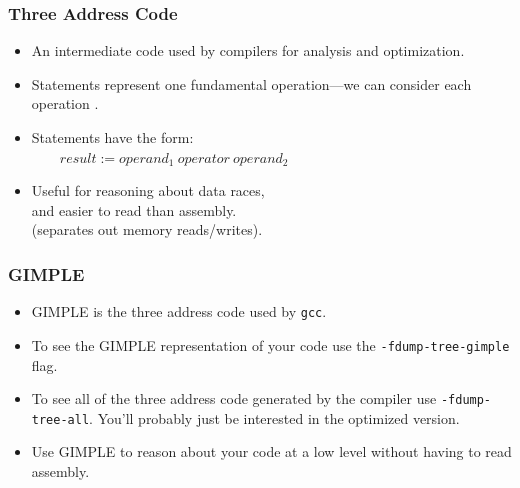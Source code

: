 
\begin{frame}
  \frametitle{Three Address Code}

  
  \begin{itemize}
    \item An intermediate code used by compilers
      for analysis and optimization.
    \vfill
    \item Statements represent one fundamental operation---we
      can consider each operation .
    \vfill
    \item Statements have the form:\\
      $\qquad result := operand_1\:operator\:operand_2$
    \vfill
    \item Useful for reasoning about data races,\\ and easier to read than assembly. \\
            \hspace*{1cm} (separates out memory reads/writes).
  \end{itemize}
  
\end{frame}

\begin{frame}
  \frametitle{GIMPLE}

  
  \begin{itemize}
    \item GIMPLE is the three address code used by {\tt gcc}.
    \vfill
    \item To see the GIMPLE representation of your code use the
      {\tt -fdump-tree-gimple} flag.
    \vfill
    \item To see all of the three address code generated by the compiler use
      {\tt -fdump-tree-all}. You'll probably just be interested in the
      optimized version.
    \vfill
    \item Use GIMPLE to reason about your code at a low level without
      having to read assembly.
  \end{itemize}
  
\end{frame}


